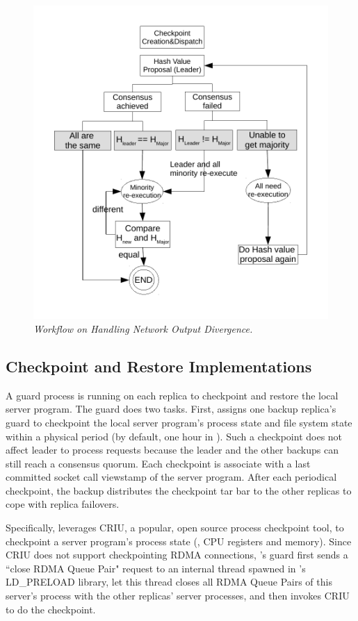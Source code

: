

\begin{figure}[t]
\centering
\includegraphics[width=.5\textwidth]{figures/output-divergence}
\vspace{-.20in}
\caption{{\em Workflow on Handling Network Output Divergence.}} 
\label{fig:divergence}
\vspace{-.05in}
\end{figure}

\subsection{Checkpoint and Restore Implementations} \label{sec:checkpoint}

A guard process is running on each replica to checkpoint and restore the local 
server program. The guard does two tasks. First, \xxx assigns one backup 
replica's guard to checkpoint the local server program's process state and file 
system state within a physical period \tcheckpoint (by default, one hour in 
\xxx). Such a checkpoint does not affect leader to process requests because the 
leader and the other backups can still reach a consensus quorum. Each 
checkpoint is associate with a last committed socket call viewstamp of the 
server program. After each periodical checkpoint, the backup distributes the 
checkpoint tar bar to the other replicas to cope with replica failovers.

Specifically, \xxx leverages CRIU, a popular, open source process checkpoint 
tool, to checkpoint a server program's process state (\eg, CPU registers and 
memory). Since CRIU does not support checkpointing RDMA connections, \xxx's 
guard first sends a ``close RDMA Queue Pair" request to an \xxx internal thread 
spawned in \xxx's LD\_PRELOAD library, let this thread closes all RDMA Queue 
Pairs of this server's process with the other replicas' server processes, and 
then invokes CRIU to do the checkpoint.


